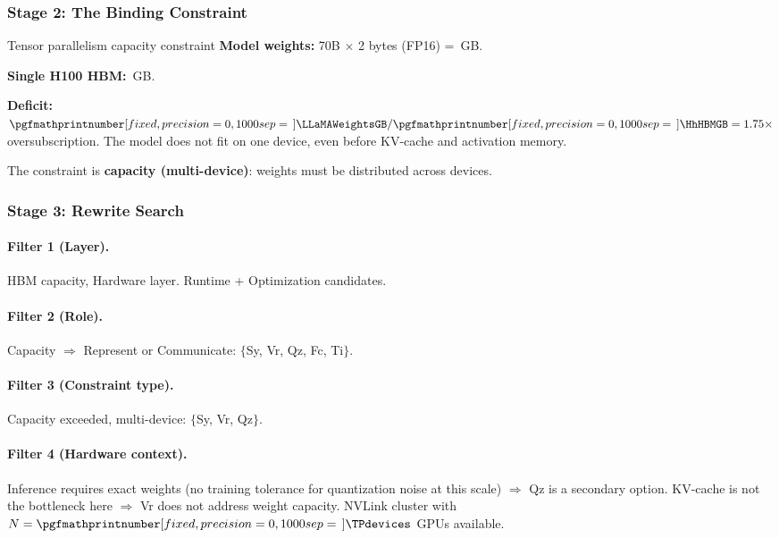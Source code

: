 \documentclass[10pt,twocolumn]{article}
\newcommand{\cvalint}[1]{\pgfmathprintnumber[fixed, precision=0, 1000 sep={\,}]{#1}}
\begin{document}
\subsubsection{Stage 2: The Binding Constraint}

\begin{napkinmath}{Tensor parallelism capacity constraint}
\textbf{Model weights:} 70B $\times$ 2 bytes (FP16) = \cvalint{\LLaMAWeightsGB}\,GB.

\textbf{Single H100 HBM:} \cvalint{\HhHBMGB}\,GB.

\textbf{Deficit:} $\cvalint{\LLaMAWeightsGB} / \cvalint{\HhHBMGB} = 1.75\times$ oversubscription. The model does not fit on one device, even before KV-cache and activation memory.

The constraint is \textbf{capacity (multi-device)}: weights must be distributed across devices.
\end{napkinmath}

\subsubsection{Stage 3: Rewrite Search}

\paragraph{Filter 1 (Layer).} HBM capacity, Hardware layer. Runtime + Optimization candidates.

\paragraph{Filter 2 (Role).} Capacity $\Rightarrow$ Represent or Communicate: $\{$Sy, Vr, Qz, Fc, Ti$\}$.

\paragraph{Filter 3 (Constraint type).} Capacity exceeded, multi-device: $\{$Sy, Vr, Qz$\}$.

\paragraph{Filter 4 (Hardware context).} Inference requires exact weights (no training tolerance for quantization noise at this scale) $\Rightarrow$ Qz is a secondary option. KV-cache is not the bottleneck here $\Rightarrow$ Vr does not address weight capacity. NVLink cluster with $N = \cvalint{\TPdevices}$ GPUs available.
\end{document}

